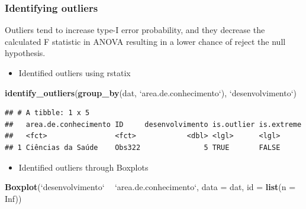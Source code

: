 \documentclass[]{article}
\newenvironment{Shaded}{\begin{snugshade}}{\end{snugshade}}
\newcommand{\DataTypeTok}[1]{\textcolor[rgb]{0.13,0.29,0.53}{#1}}
\newcommand{\KeywordTok}[1]{\textcolor[rgb]{0.13,0.29,0.53}{\textbf{#1}}}
\newcommand{\NormalTok}[1]{#1}
\newcommand{\OperatorTok}[1]{\textcolor[rgb]{0.81,0.36,0.00}{\textbf{#1}}}
\newcommand{\OtherTok}[1]{\textcolor[rgb]{0.56,0.35,0.01}{#1}}
\newcommand{\StringTok}[1]{\textcolor[rgb]{0.31,0.60,0.02}{#1}}
\providecommand{\tightlist}{%
  \setlength{\itemsep}{0pt}\setlength{\parskip}{0pt}}
\begin{document}
\hypertarget{identifying-outliers}{%
\subsubsection{Identifying outliers}\label{identifying-outliers}}

Outliers tend to increase type-I error probability, and they decrease
the calculated F statistic in ANOVA resulting in a lower chance of
reject the null hypothesis.

\begin{itemize}
\tightlist
\item
  Identified outliers using rstatix
\end{itemize}

\begin{Shaded}
\begin{Highlighting}[]
\KeywordTok{identify_outliers}\NormalTok{(}\KeywordTok{group_by}\NormalTok{(dat, }\StringTok{`}\DataTypeTok{area.de.conhecimento}\StringTok{`}\NormalTok{), }\StringTok{`}\DataTypeTok{desenvolvimento}\StringTok{`}\NormalTok{)}
\end{Highlighting}
\end{Shaded}

\begin{verbatim}
## # A tibble: 1 x 5
##   area.de.conhecimento ID     desenvolvimento is.outlier is.extreme
##   <fct>                <fct>            <dbl> <lgl>      <lgl>     
## 1 Ciências da Saúde    Obs322               5 TRUE       FALSE
\end{verbatim}

\begin{itemize}
\tightlist
\item
  Identified outliers through Boxplots
\end{itemize}

\begin{Shaded}
\begin{Highlighting}[]
\KeywordTok{Boxplot}\NormalTok{(}\StringTok{`}\DataTypeTok{desenvolvimento}\StringTok{`} \OperatorTok{~}\StringTok{ `}\DataTypeTok{area.de.conhecimento}\StringTok{`}\NormalTok{, }\DataTypeTok{data =}\NormalTok{ dat, }\DataTypeTok{id =} \KeywordTok{list}\NormalTok{(}\DataTypeTok{n =} \OtherTok{Inf}\NormalTok{))}
\end{Highlighting}
\end{Shaded}
\end{document}
